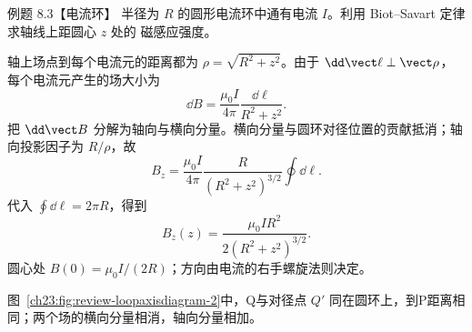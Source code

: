\begin{origexamplebox}{例题 8.3【电流环】}
半径为 $R$ 的圆形电流环中通有电流 $I$。利用 Biot--Savart 定律求轴线上距圆心 $z$ 处的
磁感应强度。

\begin{center}\end{center}
\label{fig:em23-question-3}
\end{origexamplebox}

\begin{xesolution}
轴上场点到每个电流元的距离都为 $\rho=\sqrt{R^2+z^2}$。由于
$\dd\vect\ell\perp\vect\rho$，每个电流元产生的场大小为
\[
  \dd B=\frac{\mu_0I}{4\pi}\frac{\dd\ell}{R^2+z^2}.
\]
把 $\dd\vect B$ 分解为轴向与横向分量。横向分量与圆环对径位置的贡献抵消；轴向投影因子为
$R/\rho$，故
\[
  B_z=\frac{\mu_0I}{4\pi}
  \frac{R}{(R^2+z^2)^{3/2}}\oint\dd\ell.
\]
代入 $\oint\dd\ell=2\pi R$，得到
\begin{equation}
  \boxed{B_z(z)=\frac{\mu_0IR^2}{2(R^2+z^2)^{3/2}}}.
\end{equation}
圆心处 $B(0)=\mu_0I/(2R)$；方向由电流的右手螺旋法则决定。

图~\ref{ch23:fig:review-loopaxisdiagram-2}中，Q与对径点 $Q\prime$ 同在圆环上，到P距离相同；两个场的横向分量相消，轴向分量相加。
\par\noindent\begin{minipage}{\linewidth}
\loopAxisDiagram
{}\label{ch23:fig:review-loopaxisdiagram-2}
\end{minipage}\par\medskip
\end{xesolution}

